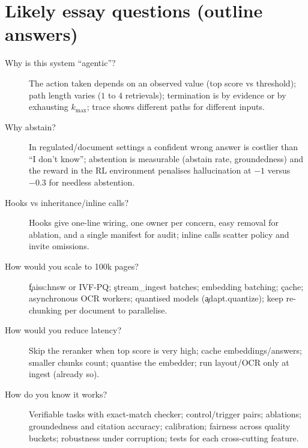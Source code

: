 \section{Likely essay questions (outline answers)}
\begin{description}
 \item[Why is this system ``agentic''?] The action taken depends on an observed value (top score vs threshold); path length varies ($1$ to $4$ retrievals); termination is by evidence or by exhausting $k_{\max}$; trace shows different paths for different inputs.
 \item[Why abstain?] In regulated/document settings a confident wrong answer is costlier than ``I don't know''; abstention is measurable (abstain rate, groundedness) and the reward in the RL environment penalises hallucination at $-1$ versus $-0.3$ for needless abstention.
 \item[Hooks vs inheritance/inline calls?] Hooks give one-line wiring, one owner per concern, easy removal for ablation, and a single manifest for audit; inline calls scatter policy and invite omissions.
 \item[How would you scale to 100k pages?] \c{faiss:hnsw} or IVF-PQ; \c{stream\_ingest} batches; embedding batching; \c{cache}; asynchronous OCR workers; quantised models (\c{adapt.quantize}); keep re-chunking per document to parallelise.
 \item[How would you reduce latency?] Skip the reranker when top score is very high; cache embeddings/answers; smaller chunks count; quantise the embedder; run layout/OCR only at ingest (already so).
 \item[How do you know it works?] Verifiable tasks with exact-match checker; control/trigger pairs; ablations; groundedness and citation accuracy; calibration; fairness across quality buckets; robustness under corruption; tests for each cross-cutting feature.
\end{description}
